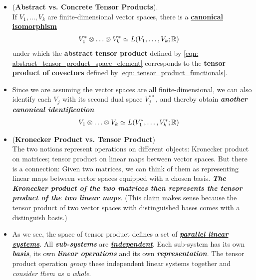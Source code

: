 \documentclass[11pt]{article}
\begin{document}
\begin{itemize}
\item \begin{proposition} (\textbf{Abstract vs. Concrete Tensor Products}).\citep{lee2003introduction}\\
If $V_1,\ldots,V_k$  are finite-dimensional vector spaces, there is a \underline{\textbf{canonical isomorphism}}
\begin{align}
V_1^{*}\otimes \ldots \otimes V_k^{*} &\simeq L(V_1,\ldots,V_k ; {\mathbb R}) \label{eqn: abstract_covector_tensor_product_iso}
\end{align} under which the \textbf{abstract tensor product} defined by \eqref{eqn: abstract_tensor_product_space_element} corresponds to the \textbf{tensor product of covectors} defined by \eqref{eqn: tensor_product_functionals}.
\end{proposition}

\item \begin{remark}
Since we are assuming the vector spaces are all finite-dimensional, we can also identify each $V_j$ with its second dual space $V_j^{**}$, and thereby obtain \emph{\textbf{another canonical identification}}
\begin{align}
V_1\otimes \ldots \otimes V_k &\simeq L(V_1^{*},\ldots,V_k^{*}; {\mathbb R}) \label{eqn: abstract_vector_tensor_product_iso}
\end{align}
\end{remark}

\item \begin{remark} (\textbf{Kronecker Product vs. Tensor Product})\\
The two notions represent operations on different objects: Kronecker product on matrices; tensor product on linear maps between vector spaces. But there is a connection: Given two matrices, we can think of them as representing linear maps between vector spaces equipped with a chosen basis. \emph{\textbf{The Kronecker product of the two matrices then represents the tensor product of the two linear maps}}. (This claim makes sense because the tensor product of two vector spaces with distinguished bases comes with a distinguish basis.)
\end{remark}

\item \begin{remark}
As we see, the space of tensor product defines a set of \underline{\emph{\textbf{parallel linear systems}}}. All \emph{\textbf{sub-systems}} are \underline{\emph{\textbf{independent}}}.  Each sub-system has its own \emph{\textbf{basis}}, its own \emph{\textbf{linear operations}} and its own \emph{\textbf{representation}}. The tensor product operation \emph{group} these independent linear systems together and \emph{consider them as a whole}. 


\end{remark}
\end{itemize}
\end{document}
